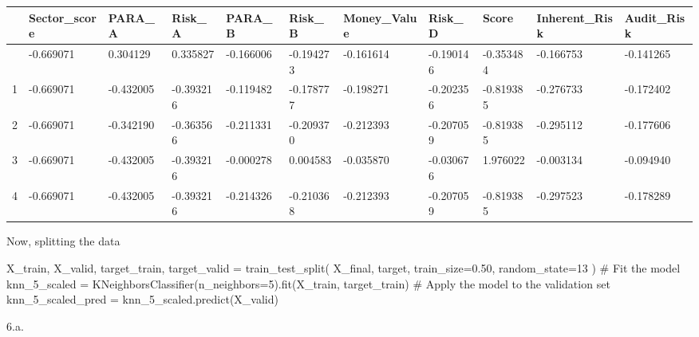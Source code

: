 \documentclass[
  11pt,
  letterpaper,
  DIV=11,
  numbers=noendperiod]{scrartcl}
\newenvironment{Shaded}{\begin{snugshade}}{\end{snugshade}}
\newcommand{\CommentTok}[1]{\textcolor[rgb]{0.37,0.37,0.37}{#1}}
\newcommand{\DecValTok}[1]{\textcolor[rgb]{0.68,0.00,0.00}{#1}}
\newcommand{\FloatTok}[1]{\textcolor[rgb]{0.68,0.00,0.00}{#1}}
\newcommand{\NormalTok}[1]{\textcolor[rgb]{0.00,0.23,0.31}{#1}}
\newcommand{\OperatorTok}[1]{\textcolor[rgb]{0.37,0.37,0.37}{#1}}
\begin{document}
\begin{longtable}[]{@{}lllllllllll@{}}
\toprule\noalign{}
& Sector\_score & PARA\_A & Risk\_A & PARA\_B & Risk\_B & Money\_Value &
Risk\_D & Score & Inherent\_Risk & Audit\_Risk \\
\midrule\noalign{}
\endhead
\bottomrule\noalign{}
\endlastfoot
0 & -0.669071 & 0.304129 & 0.335827 & -0.166006 & -0.194273 & -0.161614
& -0.190146 & -0.353484 & -0.166753 & -0.141265 \\
1 & -0.669071 & -0.432005 & -0.393216 & -0.119482 & -0.178777 &
-0.198271 & -0.202356 & -0.819385 & -0.276733 & -0.172402 \\
2 & -0.669071 & -0.342190 & -0.363566 & -0.211331 & -0.209370 &
-0.212393 & -0.207059 & -0.819385 & -0.295112 & -0.177606 \\
3 & -0.669071 & -0.432005 & -0.393216 & -0.000278 & 0.004583 & -0.035870
& -0.030676 & 1.976022 & -0.003134 & -0.094940 \\
4 & -0.669071 & -0.432005 & -0.393216 & -0.214326 & -0.210368 &
-0.212393 & -0.207059 & -0.819385 & -0.297523 & -0.178289 \\
\end{longtable}

Now, splitting the data

\begin{Shaded}
\begin{Highlighting}[]
\NormalTok{X\_train, X\_valid, target\_train, target\_valid }\OperatorTok{=}\NormalTok{ train\_test\_split(}
\NormalTok{X\_final, target, train\_size}\OperatorTok{=}\FloatTok{0.50}\NormalTok{, random\_state}\OperatorTok{=}\DecValTok{13}
\NormalTok{)}
\CommentTok{\# Fit the model}
\NormalTok{knn\_5\_scaled }\OperatorTok{=}\NormalTok{ KNeighborsClassifier(n\_neighbors}\OperatorTok{=}\DecValTok{5}\NormalTok{).fit(X\_train, target\_train)}
\CommentTok{\# Apply the model to the validation set}
\NormalTok{knn\_5\_scaled\_pred }\OperatorTok{=}\NormalTok{ knn\_5\_scaled.predict(X\_valid)}
\end{Highlighting}
\end{Shaded}

6.a.
\end{document}
